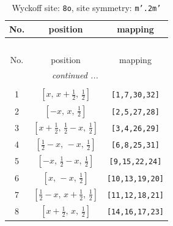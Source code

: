 \documentclass[fleqn,8pt]{jsarticle}
\begin{document}
\begin{longtable}{ccc}
\caption{Wyckoff site: {\tt 8o}, site symmetry: {\tt m'.2m'}}
 \\
 \hline \hline
No. & position & mapping \\ \hline \endfirsthead

\multicolumn{2}{l}{\tablename\ \thetable{}} \\
 \hline \hline
No. & position & mapping \\ \hline \endhead

 \hline \hline
\multicolumn{2}{r}{\footnotesize\it continued ...} \\ \endfoot

 \hline \hline
\multicolumn{2}{r}{} \\ \endlastfoot

1 & $\left[ x,\, x + \frac{1}{2},\, \frac{1}{2} \right]$ & {\tt [1,7,30,32]} \\ \hline
2 & $\left[ - x,\, x,\, \frac{1}{2} \right]$ & {\tt [2,5,27,28]} \\ \hline
3 & $\left[ x + \frac{1}{2},\, \frac{1}{2} - x,\, \frac{1}{2} \right]$ & {\tt [3,4,26,29]} \\ \hline
4 & $\left[ \frac{1}{2} - x,\, - x,\, \frac{1}{2} \right]$ & {\tt [6,8,25,31]} \\ \hline
5 & $\left[ - x,\, \frac{1}{2} - x,\, \frac{1}{2} \right]$ & {\tt [9,15,22,24]} \\ \hline
6 & $\left[ x,\, - x,\, \frac{1}{2} \right]$ & {\tt [10,13,19,20]} \\ \hline
7 & $\left[ \frac{1}{2} - x,\, x + \frac{1}{2},\, \frac{1}{2} \right]$ & {\tt [11,12,18,21]} \\ \hline
8 & $\left[ x + \frac{1}{2},\, x,\, \frac{1}{2} \right]$ & {\tt [14,16,17,23]} \\
\end{longtable}
\renewcommand{\arraystretch}{1.2}
\end{document}
